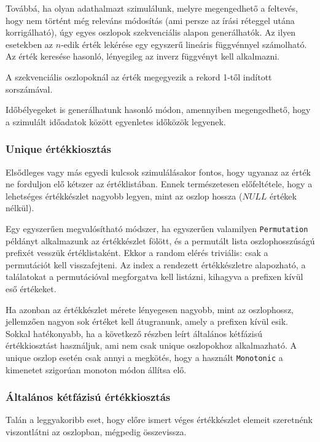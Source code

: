 \documentclass[
    parspace,
    noindent,
    nohyp,
]{elteiktdk}[2023/04/10]
\begin{document}
Továbbá, ha olyan adathalmazt szimulálunk, melyre megengedhető a feltevés,
hogy nem történt még releváns módosítás
(ami persze az írási réteggel utána korrigálható),
úgy egyes oszlopok szekvenciális alapon generálhatók.
Az ilyen esetekben az $n$-edik érték lekérése
egy egyszerű lineáris függvénnyel számolható.
Az érték keresése hasonló, lényegileg az inverz függvényt kell alkalmazni.

A szekvenciális oszlopoknál az érték megegyezik a rekord 1-től indított sorszámával.

Időbélyegeket is generálhatunk hasonló módon,
amennyiben megengedhető, hogy a szimulált időadatok között egyenletes időközök legyenek.

\subsubsection{Unique értékkiosztás}

Elsődleges vagy más egyedi kulcsok szimulálásakor fontos,
hogy ugyanaz az érték ne forduljon elő kétszer az értéklistában.
Ennek természetesen előfeltétele,
hogy a lehetséges értékkészlet nagyobb legyen, mint az oszlop hossza
($NULL$ értékek nélkül).

Egy egyszerűen megvalósítható módszer,
ha egyszerűen valamilyen \texttt{Permutation} példányt alkalmazunk az értékkészlet fölött,
és a permutált lista oszlophosszúságú prefixét vesszük értéklistaként.
Ekkor a random elérés triviális: csak a permutációt kell visszafejteni.
Az index a rendezett értékkészletre alapozható,
a találatokat a permutációval megforgatva kell listázni,
kihagyva a prefixen kívül eső értékeket.

Ha azonban az értékkészlet mérete lényegesen nagyobb, mint az oszlophossz,
jellemzően nagyon sok értéket kell átugranunk, amely a prefixen kívül esik.
Sokkal hatékonyabb, ha a következő részben leírt általános kétfázisú értékkiosztást használjuk,
ami nem csak unique oszlopokhoz alkalmazható.
A unique oszlop esetén csak annyi a megkötés, hogy a használt \texttt{Monotonic}
a kimenetet szigorúan monoton módon állítsa elő.

\subsubsection{Általános kétfázisú értékkiosztás}

Talán a leggyakoribb eset,
hogy előre ismert véges értékkészlet elemeit szeretnénk viszontlátni az oszlopban,
mégpedig összevissza.
\end{document}
